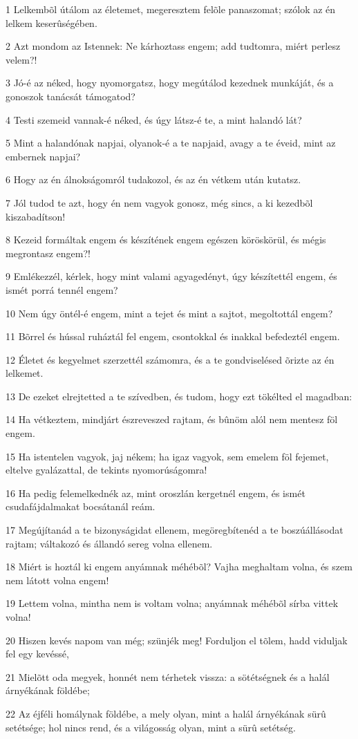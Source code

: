 \par 1 Lelkembõl útálom az életemet, megeresztem felõle panaszomat; szólok az én lelkem keserûségében.
\par 2 Azt mondom az Istennek: Ne kárhoztass engem; add tudtomra, miért perlesz velem?!
\par 3 Jó-é az néked, hogy nyomorgatsz, hogy megútálod kezednek munkáját, és a gonoszok tanácsát támogatod?
\par 4 Testi szemeid vannak-é néked, és úgy látsz-é te, a mint halandó lát?
\par 5 Mint a halandónak napjai, olyanok-é a te napjaid, avagy a te éveid, mint az embernek napjai?
\par 6 Hogy az én álnokságomról tudakozol, és az én vétkem után kutatsz.
\par 7 Jól tudod te azt, hogy én nem vagyok gonosz, még sincs, a ki kezedbõl kiszabadítson!
\par 8 Kezeid formáltak engem és készítének engem egészen köröskörül, és mégis megrontasz engem?!
\par 9 Emlékezzél, kérlek, hogy mint valami agyagedényt, úgy készítettél engem, és ismét porrá tennél engem?
\par 10 Nem úgy öntél-é engem, mint a tejet és mint a sajtot, megoltottál engem?
\par 11 Bõrrel és hússal ruháztál fel engem, csontokkal és inakkal befedeztél engem.
\par 12 Életet és kegyelmet szerzettél számomra, és a te gondviselésed õrizte az én lelkemet.
\par 13 De ezeket elrejtetted a te szívedben, és tudom, hogy ezt tökélted el magadban:
\par 14 Ha vétkeztem, mindjárt észreveszed rajtam, és bûnöm alól nem mentesz föl engem.
\par 15 Ha istentelen vagyok, jaj nékem; ha igaz vagyok, sem emelem föl fejemet, eltelve gyalázattal, de tekints nyomorúságomra!
\par 16 Ha pedig felemelkednék az, mint oroszlán kergetnél engem, és ismét csudafájdalmakat bocsátanál reám.
\par 17 Megújítanád a te bizonyságidat ellenem, megöregbítenéd a te boszúállásodat rajtam; váltakozó és állandó sereg volna ellenem.
\par 18 Miért is hoztál ki engem anyámnak méhébõl? Vajha meghaltam volna, és szem nem látott volna engem!
\par 19 Lettem volna, mintha nem is voltam volna; anyámnak méhébõl sírba vittek volna!
\par 20 Hiszen kevés napom van még; szünjék meg! Forduljon el tõlem, hadd viduljak fel egy kevéssé,
\par 21 Mielõtt oda megyek, honnét nem térhetek vissza: a sötétségnek és a halál árnyékának földébe;
\par 22 Az éjféli homálynak földébe, a mely olyan, mint a halál árnyékának sürû setétsége; hol nincs rend, és a világosság olyan, mint a sürû setétség.


